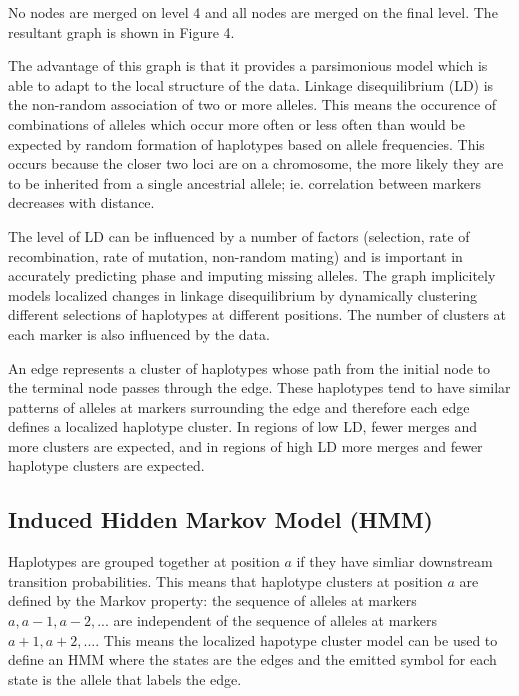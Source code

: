 \documentclass[a4paper,11pt,twoside,abstraction,titlepage]{article}
\begin{document}
\noindent No nodes are merged on level 4 and all nodes are merged on the final level.  The resultant graph is shown in Figure 4. \cite{beagle1}

The advantage of this graph is that it provides a parsimonious model which is able to adapt to the local structure of the data.  Linkage disequilibrium (LD) is the non-random association of two or more alleles.  This means the occurence of combinations of alleles which occur more often or less often than would be expected by random formation of haplotypes based on allele frequencies.  This occurs because the closer two loci are on a chromosome, the more likely they are to be inherited from a single ancestrial allele; ie. correlation between markers decreases with distance.

The level of LD can be influenced by a number of factors (selection, rate of recombination, rate of mutation, non-random mating) and is important in accurately predicting phase and imputing missing alleles.  The graph implicitely models localized changes in linkage disequilibrium by dynamically clustering different selections of haplotypes at different positions.  The number of clusters at each marker is also influenced by the data. \cite{LDwiki}

An edge represents a cluster of haplotypes whose path from the initial node to the terminal node passes through the edge.  These haplotypes tend to have similar patterns of alleles at markers surrounding the edge and therefore each edge defines a localized haplotype cluster.  In regions of low LD, fewer merges and more clusters are expected, and in regions of high LD more merges and fewer haplotype clusters are expected. \cite{beagle2}



\subsection{Induced Hidden Markov Model (HMM)}
Haplotypes are grouped together at position $a$ if they have simliar downstream transition probabilities.  This means that haplotype clusters at position $a$ are defined by the Markov property: the sequence of alleles at markers $a, a-1, a-2, ...$ are independent of the sequence of alleles at markers $a+1, a+2, ...$.  This means the localized hapotype cluster model can be used to define an HMM where the states are the edges and the emitted symbol for each state is the allele that labels the edge.
\end{document}
